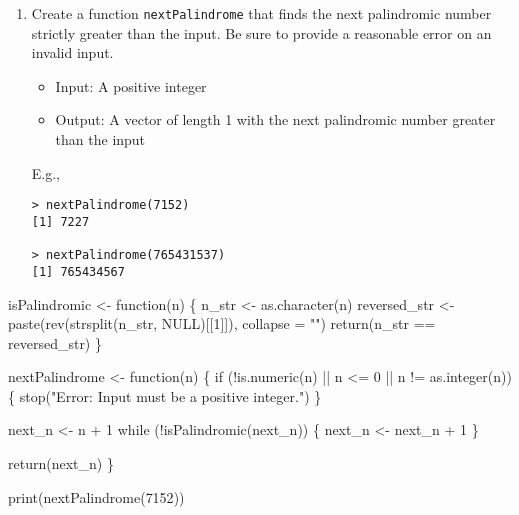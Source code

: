 \documentclass[
  letterpaper,
  DIV=11,
  numbers=noendperiod]{scrartcl}
\newenvironment{Shaded}{\begin{snugshade}}{\end{snugshade}}
\newcommand{\AttributeTok}[1]{\textcolor[rgb]{0.40,0.45,0.13}{#1}}
\newcommand{\ConstantTok}[1]{\textcolor[rgb]{0.56,0.35,0.01}{#1}}
\newcommand{\ControlFlowTok}[1]{\textcolor[rgb]{0.00,0.23,0.31}{#1}}
\newcommand{\DecValTok}[1]{\textcolor[rgb]{0.68,0.00,0.00}{#1}}
\newcommand{\FunctionTok}[1]{\textcolor[rgb]{0.28,0.35,0.67}{#1}}
\newcommand{\NormalTok}[1]{\textcolor[rgb]{0.00,0.23,0.31}{#1}}
\newcommand{\OtherTok}[1]{\textcolor[rgb]{0.00,0.23,0.31}{#1}}
\newcommand{\SpecialCharTok}[1]{\textcolor[rgb]{0.37,0.37,0.37}{#1}}
\newcommand{\StringTok}[1]{\textcolor[rgb]{0.13,0.47,0.30}{#1}}
\begin{document}
\begin{enumerate}
\def\labelenumi{\alph{enumi}.}
\setcounter{enumi}{1}
\item
  Create a function \texttt{nextPalindrome} that finds the next
  palindromic number strictly greater than the input. Be sure to provide
  a reasonable error on an invalid input.

  \begin{itemize}
  \item
    Input: A positive integer
  \item
    Output: A vector of length 1 with the next palindromic number
    greater than the input
  \end{itemize}

  E.g.,

\begin{verbatim}
> nextPalindrome(7152)
[1] 7227

> nextPalindrome(765431537)
[1] 765434567
\end{verbatim}
\end{enumerate}

\begin{Shaded}
\begin{Highlighting}[]
\NormalTok{isPalindromic }\OtherTok{\textless{}{-}} \ControlFlowTok{function}\NormalTok{(n) \{}
\NormalTok{  n\_str }\OtherTok{\textless{}{-}} \FunctionTok{as.character}\NormalTok{(n)}
\NormalTok{  reversed\_str }\OtherTok{\textless{}{-}} \FunctionTok{paste}\NormalTok{(}\FunctionTok{rev}\NormalTok{(}\FunctionTok{strsplit}\NormalTok{(n\_str, }\ConstantTok{NULL}\NormalTok{)[[}\DecValTok{1}\NormalTok{]]), }\AttributeTok{collapse =} \StringTok{""}\NormalTok{)}
  \FunctionTok{return}\NormalTok{(n\_str }\SpecialCharTok{==}\NormalTok{ reversed\_str)}
\NormalTok{\}}

\NormalTok{nextPalindrome }\OtherTok{\textless{}{-}} \ControlFlowTok{function}\NormalTok{(n) \{}
  \ControlFlowTok{if}\NormalTok{ (}\SpecialCharTok{!}\FunctionTok{is.numeric}\NormalTok{(n) }\SpecialCharTok{||}\NormalTok{ n }\SpecialCharTok{\textless{}=} \DecValTok{0} \SpecialCharTok{||}\NormalTok{ n }\SpecialCharTok{!=} \FunctionTok{as.integer}\NormalTok{(n)) \{}
    \FunctionTok{stop}\NormalTok{(}\StringTok{"Error: Input must be a positive integer."}\NormalTok{)}
\NormalTok{  \}}
  
\NormalTok{  next\_n }\OtherTok{\textless{}{-}}\NormalTok{ n }\SpecialCharTok{+} \DecValTok{1}
  \ControlFlowTok{while}\NormalTok{ (}\SpecialCharTok{!}\FunctionTok{isPalindromic}\NormalTok{(next\_n)) \{}
\NormalTok{    next\_n }\OtherTok{\textless{}{-}}\NormalTok{ next\_n }\SpecialCharTok{+} \DecValTok{1}
\NormalTok{  \}}
  
  \FunctionTok{return}\NormalTok{(next\_n)}
\NormalTok{\}}

\FunctionTok{print}\NormalTok{(}\FunctionTok{nextPalindrome}\NormalTok{(}\DecValTok{7152}\NormalTok{))}
\end{Highlighting}
\end{Shaded}
\end{document}
